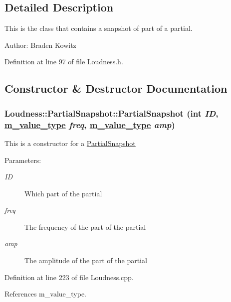 \subsection{Detailed Description}
This is the class that contains a snapshot of part of a partial. \begin{Desc}
\item[Author:]Braden Kowitz \end{Desc}




Definition at line 97 of file Loudness.h.

\subsection{Constructor \& Destructor Documentation}
\hypertarget{classLoudness_1_1PartialSnapshot_a0}{
\subsubsection[PartialSnapshot]{\setlength{\rightskip}{0pt plus 5cm}Loudness::Partial\-Snapshot::Partial\-Snapshot (int {\em ID}, \hyperlink{Types_8h_a3}{m\_\-value\_\-type} {\em freq}, \hyperlink{Types_8h_a3}{m\_\-value\_\-type} {\em amp})}}
\label{classLoudness_1_1PartialSnapshot_a0}


This is a constructor for a \hyperlink{classLoudness_1_1PartialSnapshot}{Partial\-Snapshot} \begin{Desc}
\item[Parameters:]
\begin{description}
\item[{\em ID}]Which part of the partial \item[{\em freq}]The frequency of the part of the partial \item[{\em amp}]The amplitude of the part of the partial \end{description}
\end{Desc}


Definition at line 223 of file Loudness.cpp.

References m\_\-value\_\-type.

